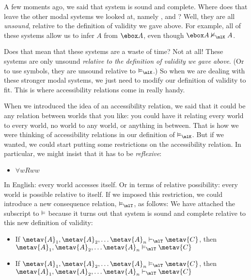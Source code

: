 A few moments ago, we said that system \mlK{} is sound and complete. Where does that leave the other modal systems we looked at, namely  \mlT, \mlSfour{} and \mlSfive? Well, they are all \emph{unsound}, relative to the definition of validity we gave above. For example, all of these systems allow us to infer $A$ from $\ebox A$, even though $\ebox A\nentails_\mlK A$.

Does that mean that these systems are a waste of time? Not at all! These systems are only unsound \emph{relative to the definition of validity we gave above}. (Or to use symbols, they are unsound relative to $\entails_\mlK$.) So when we are dealing with these stronger modal systems, we just need to modify our definition of validity to fit. This is where accessibility relations come in really handy.

When we introduced the idea of an accessibility relation, we said that it could be any relation between worlds that you like: you could have it relating every world to every world, no world to any world, or anything in between. That is how we were thinking of accessibility relations in our definition of $\entails_\mlK$. But if we wanted, we could start putting some restrictions on the accessibility relation. In particular, we might insist that it has to be \emph{reflexive}:
\begin{itemize}
	\item $\forall wRww$
\end{itemize}
In English: every world accesses itself. Or in terms of relative possibility: every world is possible relative to itself. If we imposed this restriction, we could introduce a new consequence relation, $\entails_\mlT$, as follows:
We have attached the \mlT{} subscript to $\vDash$ because it turns out that system \mlT{} is sound and complete relative to this new definition of validity:
\begin{itemize}
	\item If $\metav{A}_1,\metav{A}_2, \dots \metav{A}_n\proves_\mlT\metav{C}$, then $\metav{A}_1,\metav{A}_2, \dots \metav{A}_n\entails_\mlT\metav{C}$
	\item If $\metav{A}_1,\metav{A}_2, \dots \metav{A}_n\entails_\mlT\metav{C}$, then $\metav{A}_1,\metav{A}_2, \dots \metav{A}_n\proves_\mlT\metav{C}$
\end{itemize}
